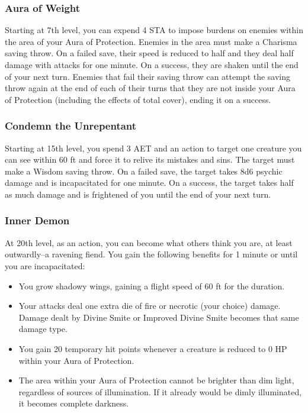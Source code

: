 \subsubsection{Aura of Weight}
Starting at 7th level, you can expend 4 STA to impose burdens on enemies within the area of your Aura of Protection. Enemies in the area must make a Charisma saving throw. On a failed save, their speed is reduced to half and they deal half damage with attacks for one minute. On a success, they are shaken until the end of your next turn. Enemies that fail their saving throw can attempt the saving throw again at the end of each of their turns that they are not inside your Aura of Protection (including the effects of total cover), ending it on a success.

\subsubsection{Condemn the Unrepentant}
Starting at 15th level, you spend 3 AET and an action to target one creature you can see within 60 ft and force it to relive its mistakes and sins. The target must make a Wisdom saving throw. On a failed save, the target takes 8d6 psychic damage and is incapacitated for one minute. On a success, the target takes half as much damage and is frightened of you until the end of your next turn.

\subsubsection{Inner Demon}
At 20th level, as an action, you can become what others think you are, at least outwardly--a ravening fiend. You gain the following benefits for 1 minute or until you are incapacitated:
\begin{itemize}
	\item You grow shadowy wings, gaining a flight speed of 60 ft for the duration.
	\item Your attacks deal one extra die of fire or necrotic (your choice) damage. Damage dealt by Divine Smite or Improved Divine Smite becomes that same damage type.
	\item You gain 20 temporary hit points whenever a creature is reduced to 0 HP within your Aura of Protection.
	\item The area within your Aura of Protection cannot be brighter than dim light, regardless of sources of illumination. If it already would be dimly illuminated, it becomes complete darkness.
\end{itemize}

